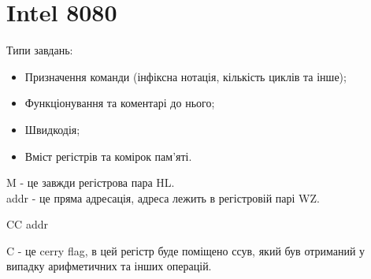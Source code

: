 \section{Intel 8080}
Типи завдань:
\begin{itemize}
\item Призначення команди (інфіксна нотація, кількість циклів та інше);
\item Функціонування та коментарі до нього;
\item Швидкодія;
\item Вміст регістрів та комірок пам’яті.
\end{itemize}
M - це завжди регістрова пара HL. \\
addr - це пряма адресація, адреса лежить в регістровій парі WZ.
\begin{exs}
\begin{listing}
CC addr
\end{listing}
C - це cerry flag, в цей регістр буде поміщено ссув, який був отриманий у випадку арифметичних та інших операцій. \\

\end{exs}
 
